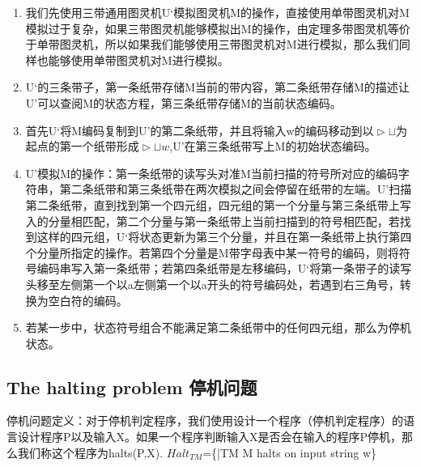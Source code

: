 \documentclass[UTF8]{ctexart}
\begin{document}
\begin{itemize}
    \begin{enumerate}
        \item 我们先使用三带通用图灵机U‘模拟图灵机M的操作，直接使用单带图灵机对M模拟过于复杂，如果三带图灵机能够模拟出M的操作，由定理多带图灵机等价于单带图灵机，所以如果我们能够使用三带图灵机对M进行模拟，那么我们同样也能够使用单带图灵机对M进行模拟。
        \item U‘的三条带子，第一条纸带存储M当前的带内容，第二条纸带存储M的描述让U'可以查阅M的状态方程，第三条纸带存储M的当前状态编码。
        \item 首先U‘将M编码复制到U’的第二条纸带，并且将输入w的编码移动到以$\vartriangleright \sqcup $为起点的第一个纸带形成$\vartriangleright \sqcup w$,U'在第三条纸带写上M的初始状态编码。
        \item U'模拟M的操作：第一条纸带的读写头对准M当前扫描的符号所对应的编码字符串，第二条纸带和第三条纸带在两次模拟之间会停留在纸带的左端。U’扫描第二条纸带，直到找到第一个四元组，四元组的第一个分量与第三条纸带上写入的分量相匹配，第二个分量与第一条纸带上当前扫描到的符号相匹配，若找到这样的四元组，U‘将状态更新为第三个分量，并且在第一条纸带上执行第四个分量所指定的操作。若第四个分量是M带字母表中某一符号的编码，则将符号编码串写入第一条纸带；若第四条纸带是左移编码，U‘将第一条带子的读写头移至左侧第一个以a左侧第一个以a开头的符号编码处，若遇到右三角号，转换为空白符的编码。
        \item 若某一步中，状态符号组合不能满足第二条纸带中的任何四元组，那么为停机状态。
    \end{enumerate}
    
\end{itemize}

\subsection{The halting problem 停机问题}

停机问题定义：对于停机判定程序，我们使用设计一个程序（停机判定程序）的语言设计程序P以及输入X。如果一个程序判断输入X是否会在输入的程序P停机，那么我们称这个程序为halts(P,X).
$Halt_{TM}$=\{<M,w>|TM M halts on input string w\}
\end{document}
